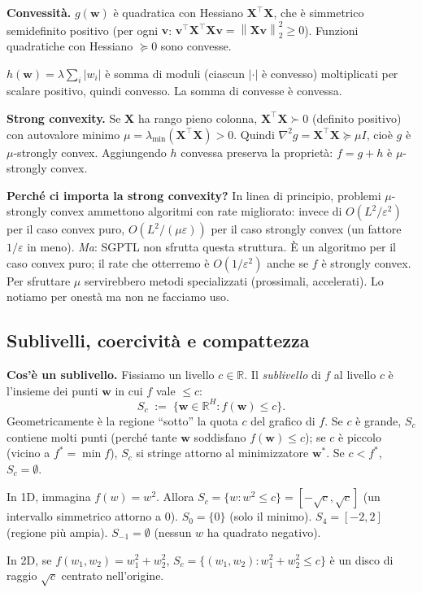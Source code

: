 \documentclass[11pt,a4paper]{article}
\newcommand{\R}{\mathbb{R}}
\newcommand{\norm}[1]{\left\|#1\right\|}
\newcommand{\bw}{\mathbf{w}}
\newcommand{\bX}{\mathbf{X}}
\newcommand{\bv}{\mathbf{v}}
\theoremstyle{definition}
\begin{document}
\begin{tcolorbox}[proofbox]
\textbf{Convessità.} $g(\bw)$ è quadratica con Hessiano $\bX^\top\bX$, che è simmetrico semidefinito positivo (per ogni $\bv$: $\bv^\top\bX^\top\bX\bv = \norm{\bX\bv}_2^2\ge 0$). Funzioni quadratiche con Hessiano $\succeq 0$ sono convesse.

$h(\bw) = \lambda\sum_i|w_i|$ è somma di moduli (ciascun $|\cdot|$ è convesso) moltiplicati per scalare positivo, quindi convesso. La somma di convesse è convessa.

\textbf{Strong convexity.} Se $\bX$ ha rango pieno colonna, $\bX^\top\bX\succ 0$ (definito positivo) con autovalore minimo $\mu = \lambda_{\min}(\bX^\top\bX) > 0$. Quindi $\nabla^2 g = \bX^\top\bX \succeq \mu I$, cioè $g$ è $\mu$-strongly convex. Aggiungendo $h$ convessa preserva la proprietà: $f = g + h$ è $\mu$-strongly convex.
\end{tcolorbox}

\begin{tcolorbox}[warning]
\textbf{Perché ci importa la strong convexity?} In linea di principio, problemi $\mu$-strongly convex ammettono algoritmi con rate migliorato: invece di $O(L^2/\varepsilon^2)$ per il caso convex puro, $O(L^2/(\mu\varepsilon))$ per il caso strongly convex (un fattore $1/\varepsilon$ in meno). \emph{Ma}: SGPTL non sfrutta questa struttura. È un algoritmo per il caso convex puro; il rate che otterremo è $O(1/\varepsilon^2)$ anche se $f$ è strongly convex. Per sfruttare $\mu$ servirebbero metodi specializzati (prossimali, accelerati). Lo notiamo per onestà ma non ne facciamo uso.
\end{tcolorbox}

\subsection{Sublivelli, coercività e compattezza}

\textbf{Cos'è un sublivello.} Fissiamo un livello $c\in\R$. Il \emph{sublivello} di $f$ al livello $c$ è l'insieme dei punti $\bw$ in cui $f$ vale $\le c$:
\[
S_c \;:=\; \{\bw\in\R^H : f(\bw) \le c\}.
\]
Geometricamente è la regione ``sotto'' la quota $c$ del grafico di $f$. Se $c$ è grande, $S_c$ contiene molti punti (perché tante $\bw$ soddisfano $f(\bw)\le c$); se $c$ è piccolo (vicino a $f^* = \min f$), $S_c$ si stringe attorno al minimizzatore $\bw^*$. Se $c < f^*$, $S_c = \emptyset$.

\begin{tcolorbox}[example]
In 1D, immagina $f(w) = w^2$. Allora $S_c = \{w : w^2 \le c\} = [-\sqrt c, \sqrt c]$ (un intervallo simmetrico attorno a $0$). $S_0 = \{0\}$ (solo il minimo). $S_4 = [-2, 2]$ (regione più ampia). $S_{-1} = \emptyset$ (nessun $w$ ha quadrato negativo).

In 2D, se $f(w_1, w_2) = w_1^2 + w_2^2$, $S_c = \{(w_1,w_2) : w_1^2+w_2^2 \le c\}$ è un disco di raggio $\sqrt c$ centrato nell'origine.
\end{tcolorbox}
\end{document}
